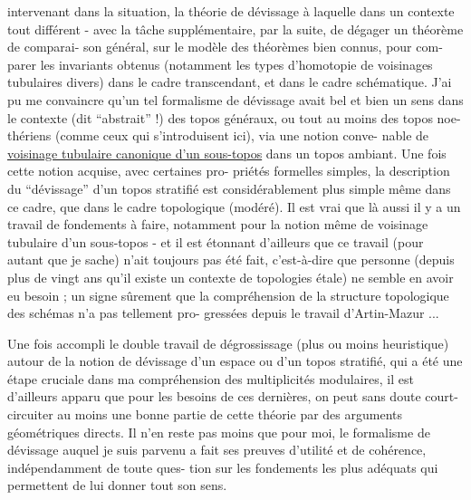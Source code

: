 
intervenant dans la situation, la théorie de dévissage à laquelle
 dans un contexte tout différent - avec la tâche
supplémentaire, par la suite, de dégager un théorème de comparai-%
son général, sur le modèle des théorèmes bien connus, pour com-%
parer les invariants obtenus (notamment les types d'homotopie de
voisinages tubulaires divers) dans le cadre transcendant, et dans
le cadre schématique. J'ai pu me convaincre qu'un tel formalisme
de dévissage avait bel et bien un sens dans le contexte (dit
``abstrait'' !) des topos généraux, ou tout au moins des topos noe-%
thériens (comme ceux qui s'introduisent ici), via une notion conve-%
nable de \uline{voisinage tubulaire canonique d'un sous-topos} dans un
topos ambiant. Une fois cette notion acquise, avec certaines pro-%
priétés formelles simples, la description du ``dévissage'' d'un
topos stratifié est considérablement plus simple même dans ce
cadre, que dans le cadre topologique (modéré). Il est vrai que
là aussi il y a un travail de fondements à faire, notamment pour
la notion même de voisinage tubulaire d'un sous-topos - et il est
étonnant d'ailleurs que ce travail (pour autant que je sache)
n'ait toujours pas été fait, c'est-à-dire que personne (depuis plus
de vingt ans qu'il existe un contexte de topologies étale) ne
semble en avoir eu besoin ; un signe sûrement que la compréhension
de la structure topologique des schémas n'a pas tellement pro-%
gressées depuis le travail d'Artin-Mazur ...

Une fois accompli le double travail de dégrossissage
(plus ou moins heuristique) autour de la notion de dévissage d'un
espace ou d'un topos stratifié, qui a été une étape cruciale dans
ma compréhension des multiplicités modulaires, il est d'ailleurs
apparu que pour les besoins de ces dernières, on peut sans doute
court-circuiter au moins une bonne partie de cette théorie par des
arguments géométriques directs. Il n'en reste pas moins que pour
moi, le formalisme de dévissage auquel je suis parvenu a fait ses
preuves d'utilité et de cohérence, indépendamment de toute ques-%
tion sur les fondements les plus adéquats qui permettent de lui
donner tout son sens.

